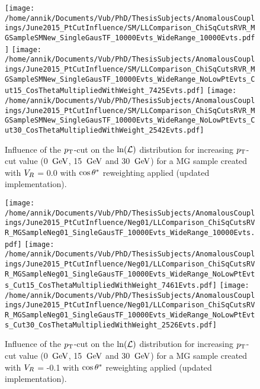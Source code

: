 \begin{figure}[h!t]
 \centering
 \texttt{[image: /home/annik/Documents/Vub/PhD/ThesisSubjects/AnomalousCouplings/June2015\_PtCutInfluence/SM/LLComparison\_ChiSqCutsRVR\_MGSampleSMNew\_SingleGausTF\_10000Evts\_WideRange\_10000Evts.pdf]}
 \texttt{[image: /home/annik/Documents/Vub/PhD/ThesisSubjects/AnomalousCouplings/June2015\_PtCutInfluence/SM/LLComparison\_ChiSqCutsRVR\_MGSampleSMNew\_SingleGausTF\_10000Evts\_WideRange\_NoLowPtEvts\_Cut15\_CosThetaMultipliedWithWeight\_7425Evts.pdf]}
 \texttt{[image: /home/annik/Documents/Vub/PhD/ThesisSubjects/AnomalousCouplings/June2015\_PtCutInfluence/SM/LLComparison\_ChiSqCutsRVR\_MGSampleSMNew\_SingleGausTF\_10000Evts\_WideRange\_NoLowPtEvts\_Cut30\_CosThetaMultipliedWithWeight\_2542Evts.pdf]}
 \caption{Influence of the $p_{\textrm T}$-cut on the $\ln(\mathcal{L})$ distribution for increasing $p_{\textrm T}$-cut value (0 $\, \mathrm{GeV}$, 15 $\, \mathrm{GeV}$ and 30 $\, \mathrm{GeV}$) for a MG sample created with $V_{R}$ = 0.0 with $\cos \theta^{*}$ reweighting applied (updated implementation).}
 \label{fig::CosThetaSMUpdate}
\end{figure}

\begin{figure}[h!t]
 \centering
 \texttt{[image: /home/annik/Documents/Vub/PhD/ThesisSubjects/AnomalousCouplings/June2015\_PtCutInfluence/Neg01/LLComparison\_ChiSqCutsRVR\_MGSampleNeg01\_SingleGausTF\_10000Evts\_WideRange\_10000Evts.pdf]}
 \texttt{[image: /home/annik/Documents/Vub/PhD/ThesisSubjects/AnomalousCouplings/June2015\_PtCutInfluence/Neg01/LLComparison\_ChiSqCutsRVR\_MGSampleNeg01\_SingleGausTF\_10000Evts\_WideRange\_NoLowPtEvts\_Cut15\_CosThetaMultipliedWithWeight\_7461Evts.pdf]}
 \texttt{[image: /home/annik/Documents/Vub/PhD/ThesisSubjects/AnomalousCouplings/June2015\_PtCutInfluence/Neg01/LLComparison\_ChiSqCutsRVR\_MGSampleNeg01\_SingleGausTF\_10000Evts\_WideRange\_NoLowPtEvts\_Cut30\_CosThetaMultipliedWithWeight\_2526Evts.pdf]}
 \caption{Influence of the $p_{\textrm T}$-cut on the $\ln(\mathcal{L})$ distribution for increasing $p_{\textrm T}$-cut value (0 $\, \mathrm{GeV}$, 15 $\, \mathrm{GeV}$ and 30 $\, \mathrm{GeV}$) for a MG sample created with $V_{R}$ = -0.1 with $\cos \theta^{*}$ reweighting applied (updated implementation).}
 \label{fig::CosThetaNeg01Update}
\end{figure}

